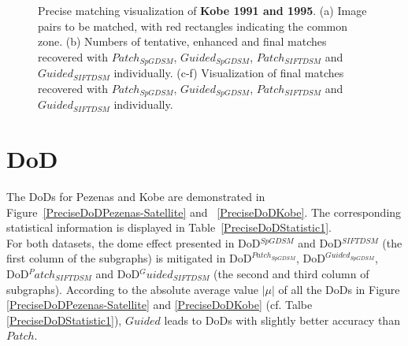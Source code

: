 \begin{figure}[htbp]
\begin{center}
{\begin{minipage}[t]{0.48\linewidth}
			\end{minipage}%
		}
		\caption{Precise matching visualization of \textbf{Kobe 1991 and 1995}. (a) Image pairs to be matched, with red rectangles indicating the common zone. (b) Numbers of tentative, enhanced and final matches recovered with $Patch_{SpGDSM}$, $Guided_{SpGDSM}$, $Patch_{SIFTDSM}$ and $Guided_{SIFTDSM}$ individually. (c-f) Visualization of final matches recovered with $Patch_{SpGDSM}$, $Guided_{SpGDSM}$, $Patch_{SIFTDSM}$ and $Guided_{SIFTDSM}$ individually.}
		\label{MatchVizKobe}
	\end{center}
\end{figure} 

\section{DoD}
\label{sec:PreciseDoD}
The \ac{DoD}s for Pezenas and Kobe are demonstrated in Figure~\ref{PreciseDoDPezenas-Satellite} and ~\ref{PreciseDoDKobe}. 
The corresponding statistical information is displayed in Table~\ref{PreciseDoDStatistic1}.\\

For both datasets, the dome effect presented in DoD$^{SpGDSM}$ and DoD$^{SIFTDSM}$ (the first column of the subgraphs) is mitigated in DoD$^{Patch_{SpGDSM}}$, DoD$^{Guided_{SpGDSM}}$, DoD$^Patch_{SIFTDSM}$ and DoD$^Guided_{SIFTDSM}$ (the second and third column of subgraphs). 
According to the absolute average value $|\mu|$ of all the \ac{DoD}s in Figure \ref{PreciseDoDPezenas-Satellite} and \ref{PreciseDoDKobe} (cf. Talbe \ref{PreciseDoDStatistic1}), $Guided$ leads to \ac{DoD}s with slightly better accuracy than $Patch$.\\

